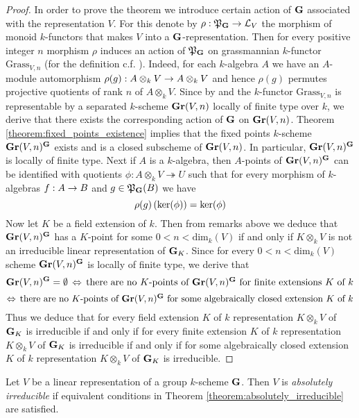 \begin{proof}
In order to prove the theorem we introduce certain action of $\mathbf{G}$ associated with the representation $V$. For this denote by $\rho:{\mathfrak P}_{\mathbf{G}}\rightarrow {\mathcal L}_V$ the morphism of monoid $k$-functors that makes $V$ into a $\mathbf{G}$-representation. Then for every positive integer $n$ morphism $\rho$ induces an action of ${\mathfrak P}_{\mathbf{G}}$ on grassmannian $k$-functor $\mathrm{Grass}_{V,n}$ (for the definition c.f. {\cite[Section 6]{kfunctors}}). Indeed, for each $k$-algebra $A$ we have an $A$-module automorphism $\rho(g):A\otimes_kV \rightarrow A\otimes_kV$ and hence $\rho(g)$ permutes projective quotients of rank $n$ of $A\otimes_kV$. Since by {\cite[Theorem 6.3]{kfunctors}} and {\cite[Theorem 6.5]{kfunctors}} the $k$-functor $\mathrm{Grass}_{V,n}$ is representable by a separated $k$-scheme $\mathbf{Gr}(V,n)$ locally of finite type over $k$, we derive that there exists the corresponding action of $\mathbf{G}$ on $\mathbf{Gr}(V,n)$. Theorem \ref{theorem:fixed_points_existence} implies that the fixed points $k$-scheme $\mathbf{Gr}(V,n)^{\mathbf{G}}$ exists and is a closed subscheme of $\mathbf{Gr}(V,n)$. In particular, $\mathbf{Gr}(V,n)^{\mathbf{G}}$ is locally of finite type. Next if $A$ is a $k$-algebra, then $A$-points of $\mathbf{Gr}(V,n)^{\mathbf{G}}$ can be identified with quotients $\phi:A\otimes_kV\twoheadrightarrow U$ such that for every morphism of $k$-algebras $f:A\rightarrow B$ and $g\in {\mathfrak P}_{\mathbf{G}}(B)$ we have
$$\rho(g)\left(\mathrm{ker}(\phi)\right) = \mathrm{ker}(\phi)$$
Now let $K$ be a field extension of $k$. Then from remarks above we deduce that $\mathbf{Gr}(V,n)^{\mathbf{G}}$ has a $K$-point for some $0 < n <\mathrm{dim}_k(V)$ if and only if $K\otimes_kV$ is not an irreducible linear representation of $\mathbf{G}_K$. Since for every $0 < n < \mathrm{dim}_k(V)$ scheme $\mathbf{Gr}(V,n)^{\mathbf{G}}$ is locally of finite type, we derive that
$$\mathbf{Gr}(V,n)^{\mathbf{G}}= \emptyset\,\Leftrightarrow\,\mbox{there are no $K$-points of $\mathbf{Gr}(V,n)^{\mathbf{G}}$ for finite extensions $K$ of $k$}$$
$$\Leftrightarrow\,\mbox{there are no $K$-points of $\mathbf{Gr}(V,n)^{\mathbf{G}}$ for some algebraically closed extension $K$ of $k$}$$
Thus we deduce that for every field extension $K$ of $k$ representation $K\otimes_kV$ of $\mathbf{G}_K$ is irreducible if and only if for every finite extension $K$ of $k$ representation $K\otimes_kV$ of $\mathbf{G}_K$ is irreducible if and only if for some algebraically closed  extension $K$ of $k$ representation $K\otimes_kV$ of $\mathbf{G}_K$ is irreducible.
\end{proof}

\begin{definition}
Let $V$ be a linear representation of a group $k$-scheme $\mathbf{G}$. Then $V$ is \textit{absolutely irreducible} if equivalent conditions in Theorem \ref{theorem:absolutely_irreducible} are satisfied.
\end{definition}

